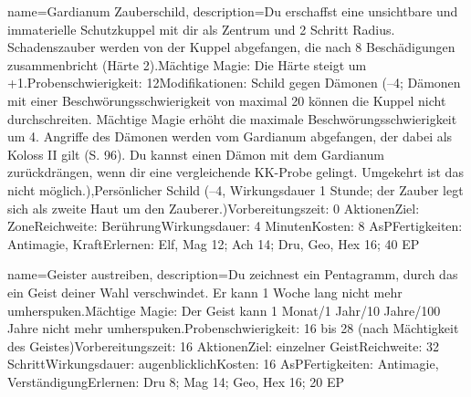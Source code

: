 {
    name={Gardianum Zauberschild},
    description={Du erschaffst eine unsichtbare und immaterielle Schutzkuppel mit dir als Zentrum und 2 Schritt Radius. Schadenszauber werden von der Kuppel abgefangen, die nach 8 Beschädigungen zusammenbricht (Härte 2).\newline Mächtige Magie: Die Härte steigt um +1.\newline Probenschwierigkeit: 12\newline Modifikationen: Schild gegen Dämonen (–4; Dämonen mit einer Beschwörungsschwierigkeit von maximal 20 können die Kuppel nicht durchschreiten. Mächtige Magie erhöht die maximale Beschwörungsschwierigkeit um 4. Angriffe des Dämonen werden vom Gardianum abgefangen, der dabei als Koloss II gilt (S. 96). Du kannst einen Dämon mit dem Gardianum zurückdrängen, wenn dir eine vergleichende KK-Probe gelingt. Umgekehrt ist das nicht möglich.),\newline Persönlicher Schild (–4, Wirkungsdauer 1 Stunde; der Zauber legt sich als zweite Haut um den Zauberer.)\newline Vorbereitungszeit: 0 Aktionen\newline Ziel: Zone\newline Reichweite: Berührung\newline Wirkungsdauer: 4 Minuten\newline Kosten: 8 AsP\newline Fertigkeiten: Antimagie, Kraft\newline Erlernen: Elf, Mag 12; Ach 14; Dru, Geo, Hex 16; 40 EP}
}


{
    name={Geister austreiben},
    description={Du zeichnest ein Pentagramm, durch das ein Geist deiner Wahl verschwindet. Er kann 1 Woche lang nicht mehr umherspuken.\newline Mächtige Magie: Der Geist kann 1 Monat/1 Jahr/10 Jahre/100 Jahre nicht mehr umherspuken.\newline Probenschwierigkeit: 16 bis 28 (nach Mächtigkeit des Geistes)\newline Vorbereitungszeit: 16 Aktionen\newline Ziel: einzelner Geist\newline Reichweite: 32 Schritt\newline Wirkungsdauer: augenblicklich\newline Kosten: 16 AsP\newline Fertigkeiten: Antimagie, Verständigung\newline Erlernen: Dru 8; Mag 14; Geo, Hex 16; 20 EP}
}


